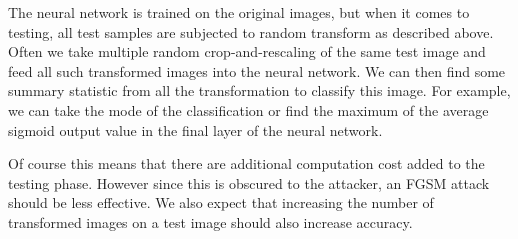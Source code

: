 The neural network is trained on the original images, but when it comes to testing, all test samples are subjected to random transform as described above. Often we take multiple random crop-and-rescaling of the same test image and feed all such transformed images into the neural network. We can then find some summary statistic from all the transformation to classify this image. For example, we can take the mode of the classification or find the maximum of the average sigmoid output value in the final layer of the neural network. 

Of course this means that there are additional computation cost added to the testing phase. However since this is obscured to the attacker, an FGSM attack should be less effective. We also expect that increasing the number of transformed images on a test image should also increase accuracy.

